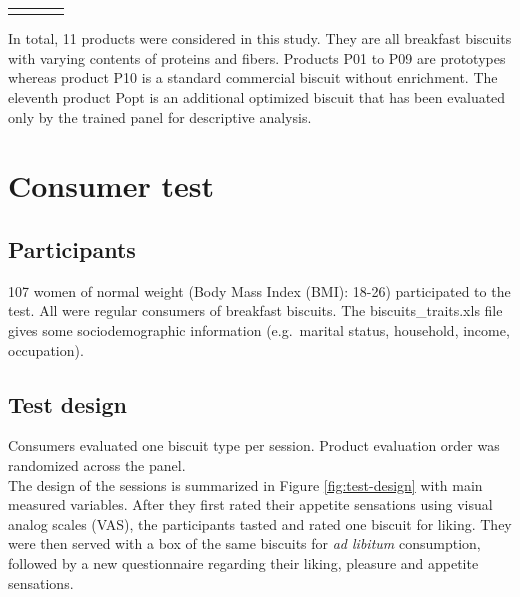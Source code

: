 \documentclass[
]{book}
\begin{document}
\begin{table}
\begin{longtable}{|p{0.74in}|p{0.70in}|p{0.56in}|p{1.58in}}
\noalign{\global\setlength{\arrayrulewidth}{2pt}}\arrayrulecolor[HTML]{000000}\cline{1-4}

\end{longtable}

\end{table}

In total, 11 products were considered in this study. They are all breakfast biscuits with varying contents of proteins and fibers. Products P01 to P09 are prototypes whereas product P10 is a standard commercial biscuit without enrichment. The eleventh product Popt is an additional optimized biscuit that has been evaluated only by the trained panel for descriptive analysis.

\hypertarget{consumer-test}{%
\section{Consumer test}\label{consumer-test}}

\hypertarget{participants}{%
\subsection{Participants}\label{participants}}

107 women of normal weight (Body Mass Index (BMI): 18-26) participated to the test. All were regular consumers of breakfast biscuits. The biscuits\_traits.xls file gives some sociodemographic information (e.g.~marital status, household, income, occupation).

\hypertarget{test-design}{%
\subsection{Test design}\label{test-design}}

Consumers evaluated one biscuit type per session. Product evaluation order was randomized across the panel.\\
The design of the sessions is summarized in Figure \ref{fig:test-design} with main measured variables. After they first rated their appetite sensations using visual analog scales (VAS), the participants tasted and rated one biscuit for liking. They were then served with a box of the same biscuits for \emph{ad libitum} consumption, followed by a new questionnaire regarding their liking, pleasure and appetite sensations.
\end{document}
